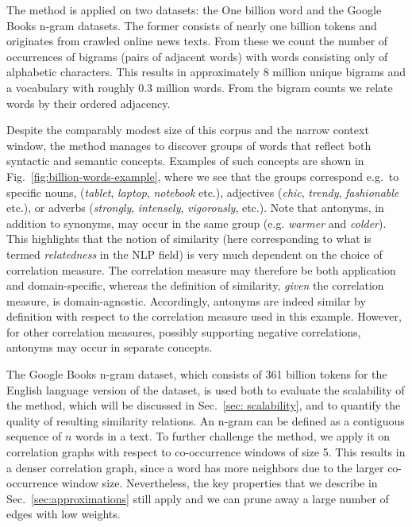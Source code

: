\documentclass{kais}
\begin{document}
The method is applied on two datasets: the One billion word \cite{Chelba13} and
the Google Books n-gram \cite{Michel10,Lin12} datasets. The former consists of
nearly one billion tokens and originates from crawled online news texts. From
these we count the number of occurrences of bigrams (pairs of adjacent words) with words consisting only
of alphabetic characters. This results in approximately 8 million unique
bigrams and a vocabulary with roughly 0.3 million words. From the bigram counts
we relate words by their ordered adjacency.

Despite the comparably modest size of this corpus and the narrow context window, the method
manages to discover groups of words that reflect both syntactic and semantic
concepts. Examples of such concepts are shown in Fig.\ \ref{fig:billion-words-example},
where we see that the groups correspond e.g.\ to specific nouns,
 (\emph{tablet}, \emph{laptop}, \emph{notebook} etc.), adjectives
 (\emph{chic}, \emph{trendy}, \emph{fashionable} etc.), or adverbs
 (\emph{strongly}, \emph{intensely}, \emph{vigorously}, etc.). Note that antonyms, in addition to synonyms, 
 may occur in the same group (e.g. \emph{warmer} and \emph{colder}). This highlights that the notion of similarity (here
 corresponding to what is termed \emph{relatedness} in the NLP field)
 is very much dependent on the choice of correlation measure. The correlation measure may therefore be both
 application and domain-specific, whereas the definition of similarity, \emph{given} the correlation measure, is domain-agnostic. 
 Accordingly, antonyms are indeed similar by definition with respect to the correlation measure used in this example. However, 
 for other correlation measures, possibly supporting negative correlations, antonyms may occur in separate concepts.

The Google Books n-gram dataset, which consists of 361
billion tokens for the English language version of the dataset, is used both to evaluate the scalability of the
method, which will be discussed in Sec.\ \ref{sec: scalability}, and to quantify the quality of resulting similarity
relations. An n-gram can be defined as a contiguous sequence of $n$ words in a text.
To further challenge the method, we apply it on correlation graphs with respect to co-occurrence
windows of size 5. This results in a denser correlation graph, since a
word has more neighbors due to the larger co-occurrence window size. Nevertheless, the
key properties that we describe in Sec.\ \ref{sec:approximations} still
apply and we can prune away a large number of edges with low weights.
\end{document}
